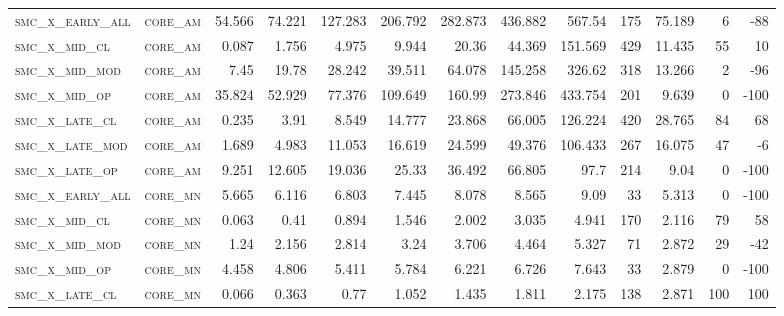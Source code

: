 \begin{landscape}
\begin{center}
\begin{footnotesize}
\begin{longtable}{llrrrrrrrr|rrr}
\textsc{smc\_x\_early\_all} & \textsc{core\_am  }   & 54.566   & 74.221   & 127.283  & 206.792  & 282.873  & 436.882  & 567.54   & 175    & 75.189        & 6             & -88             \\
\textsc{smc\_x\_mid\_cl   } & \textsc{core\_am  }   & 0.087    & 1.756    & 4.975    & 9.944    & 20.36    & 44.369   & 151.569  & 429    & 11.435        & 55            & 10              \\
\textsc{smc\_x\_mid\_mod  } & \textsc{core\_am  }   & 7.45     & 19.78    & 28.242   & 39.511   & 64.078   & 145.258  & 326.62   & 318    & 13.266        & 2             & -96             \\
\textsc{smc\_x\_mid\_op   } & \textsc{core\_am  }   & 35.824   & 52.929   & 77.376   & 109.649  & 160.99   & 273.846  & 433.754  & 201    & 9.639         & 0             & -100            \\
\textsc{smc\_x\_late\_cl  } & \textsc{core\_am  }   & 0.235    & 3.91     & 8.549    & 14.777   & 23.868   & 66.005   & 126.224  & 420    & 28.765        & 84            & 68              \\
\textsc{smc\_x\_late\_mod } & \textsc{core\_am  }   & 1.689    & 4.983    & 11.053   & 16.619   & 24.599   & 49.376   & 106.433  & 267    & 16.075        & 47            & -6              \\
\textsc{smc\_x\_late\_op  } & \textsc{core\_am  }   & 9.251    & 12.605   & 19.036   & 25.33    & 36.492   & 66.805   & 97.7     & 214    & 9.04          & 0             & -100            \\
\textsc{smc\_x\_early\_all} & \textsc{core\_mn  }   & 5.665    & 6.116    & 6.803    & 7.445    & 8.078    & 8.565    & 9.09     & 33     & 5.313         & 0             & -100            \\
\textsc{smc\_x\_mid\_cl   } & \textsc{core\_mn  }   & 0.063    & 0.41     & 0.894    & 1.546    & 2.002    & 3.035    & 4.941    & 170    & 2.116         & 79            & 58              \\
\textsc{smc\_x\_mid\_mod  } & \textsc{core\_mn  }   & 1.24     & 2.156    & 2.814    & 3.24     & 3.706    & 4.464    & 5.327    & 71     & 2.872         & 29            & -42             \\
\textsc{smc\_x\_mid\_op   } & \textsc{core\_mn  }   & 4.458    & 4.806    & 5.411    & 5.784    & 6.221    & 6.726    & 7.643    & 33     & 2.879         & 0             & -100            \\
\textsc{smc\_x\_late\_cl  } & \textsc{core\_mn  }   & 0.066    & 0.363    & 0.77     & 1.052    & 1.435    & 1.811    & 2.175    & 138    & 2.871         & 100           & 100             \\

\end{longtable}
\end{footnotesize}
\end{center}
\end{landscape}
